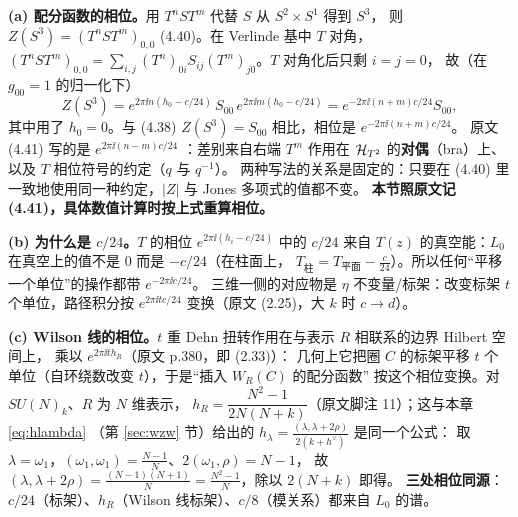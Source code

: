 \begin{derivation}[D8.4：标架反常 (4.41)]
\textbf{(a) 配分函数的相位。}用 $T^nST^m$ 代替 $S$ 从 $S^2\times S^1$ 得到 $S^3$，
则 $Z(S^3)=(T^nST^m)_{0,0}$ (4.40)。在 Verlinde 基中 $T$ 对角，
$(T^nST^m)_{0,0}=\sum_{i,j}(T^n)_{0i}S_{ij}(T^m)_{j0}$。$T$ 对角化后只剩 $i=j=0$，
故（在 $g_{00}=1$ 的归一化下）
\[
Z(S^3)=e^{2\pi\ii n(h_0-c/24)}\,S_{00}\,e^{2\pi\ii m(h_0-c/24)}
=e^{-2\pi\ii(n+m)c/24}S_{00},
\]
其中用了 $h_0=0$。与 (4.38) $Z(S^3)=S_{00}$ 相比，相位是 $e^{-2\pi\ii(n+m)c/24}$。
原文 (4.41) 写的是 $e^{2\pi\ii(n-m)c/24}$ ：差别来自右端 $T^m$ 作用在
$\mathcal{H}_{T^2}$ 的\textbf{对偶}（bra）上、以及 $T$ 相位符号的约定（$q$ 与 $q^{-1}$）。
两种写法的关系是固定的：只要在 (4.40) 里一致地使用同一种约定，$|Z|$ 与 Jones 多项式的值都不变。
\textbf{本节照原文记 (4.41)，具体数值计算时按上式重算相位。}\ours

\textbf{(b) 为什么是 $c/24$。}$T$ 的相位 $e^{2\pi\ii(h_i-c/24)}$ 中的 $c/24$ 来自
$T(z)$ 的真空能：$L_0$ 在真空上的值不是 $0$ 而是 $-c/24$（在柱面上，
$T_{\text{柱}}=T_{\text{平面}}-\frac{c}{24}$）。所以任何“平移一个单位”的操作都带 $e^{-2\pi\ii c/24}$。
三维一侧的对应物是 $\eta$ 不变量/标架：改变标架 $t$ 个单位，路径积分按
$e^{2\pi\ii t c/24}$ 变换（原文 (2.25)，大 $k$ 时 $c\to d$）。

\textbf{(c) Wilson 线的相位。}$t$ 重 Dehn 扭转作用在与表示 $R$ 相联系的边界 Hilbert 空间上，
乘以 $e^{2\pi\ii t h_R}$（原文 p.380，即 (2.33)）：
几何上它把圈 $C$ 的标架平移 $t$ 个单位（自环绕数改变 $t$），于是“插入 $W_R(C)$ 的配分函数”
按这个相位变换。对 $SU(N)_k$、$R$ 为 $N$ 维表示，
$h_R=\dfrac{N^2-1}{2N(N+k)}$（原文脚注 11）；这与本章 \eqref{eq:hlambda}
（第 \ref{sec:wzw} 节）给出的 $h_\lambda=\frac{(\lambda,\lambda+2\rho)}{2(k+h^\vee)}$ 是同一个公式：
取 $\lambda=\omega_1$，$(\omega_1,\omega_1)=\frac{N-1}{N}$、$2(\omega_1,\rho)=N-1$，
故 $(\lambda,\lambda+2\rho)=\frac{(N-1)(N+1)}{N}=\frac{N^2-1}{N}$，除以 $2(N+k)$ 即得。
\textbf{三处相位同源}：$c/24$（标架）、$h_R$（Wilson 线标架）、$c/8$（模关系）都来自 $L_0$ 的谱。\ours
\end{derivation}

